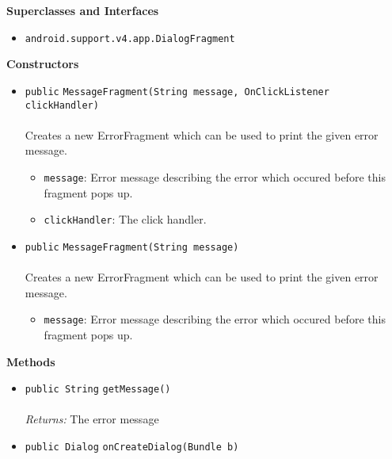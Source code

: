 \textbf{\sffamily Superclasses and Interfaces}
\begin{itemize}
\item \lstinline|android.support.v4.app.DialogFragment|
\end{itemize}


\textbf{\sffamily Constructors}
\begin{itemize}
\item \lstinline|public| \lstinline|MessageFragment|\lstinline|(String message, OnClickListener clickHandler)|\\ \\[-0.6em]
Creates a new ErrorFragment which can be used to print the given error message.
\begin{itemize}
\item \lstinline|message|: Error message describing the error which occured before this fragment pops up.
\item \lstinline|clickHandler|: The click handler.
\end{itemize}



\item \lstinline|public| \lstinline|MessageFragment|\lstinline|(String message)|\\ \\[-0.6em]
Creates a new ErrorFragment which can be used to print the given error message.
\begin{itemize}
\item \lstinline|message|: Error message describing the error which occured before this fragment pops up.
\end{itemize}



\end{itemize}


\textbf{\sffamily Methods}
\begin{itemize}
\item \lstinline|public String| \lstinline|getMessage|\lstinline|()|\\ \\[-0.6em]
\emph{Returns:} The error message



\item \lstinline|public Dialog| \lstinline|onCreateDialog|\lstinline|(Bundle b)| \\[-0.6em]




\end{itemize}


